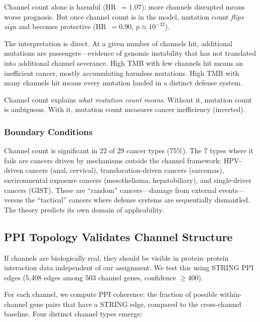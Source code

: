 \documentclass[11pt]{article}
\begin{document}
Channel count alone is harmful (HR~$= 1.07$): more channels
disrupted means worse prognosis. But once channel count is in the
model, mutation count \emph{flips sign} and becomes protective
(HR~$= 0.90$, $p \approx 10^{-32}$).

The interpretation is direct. At a given number of channels hit,
additional mutations are passengers---evidence of genomic
instability that has not translated into additional channel
severance. High TMB with few channels hit means an inefficient
cancer, mostly accumulating harmless mutations. High TMB with
many channels hit means every mutation landed in a distinct
defense system.

Channel count explains \emph{what mutation count means}. Without
it, mutation count is ambiguous. With it, mutation count measures
cancer inefficiency (inverted).

\subsubsection{Boundary Conditions}

Channel count is significant in 22 of 29 cancer types (75\%).
The 7 types where it fails are cancers driven by mechanisms
outside the channel framework: HPV-driven cancers (anal,
cervical), translocation-driven cancers (sarcomas), environmental
exposure cancers (mesothelioma, hepatobiliary), and single-driver
cancers (GIST). These are ``random'' cancers---damage from
external events---versus the ``tactical'' cancers where defense
systems are sequentially dismantled. The theory predicts its own
domain of applicability.

\subsection{PPI Topology Validates Channel Structure}
\label{sec:ppi}

If channels are biologically real, they should be visible in
protein--protein interaction data independent of our assignment.
We test this using STRING PPI edges (5{,}408 edges among 503
channel genes, confidence $\geq 400$).

For each channel, we compute PPI coherence: the fraction of
possible within-channel gene pairs that have a STRING edge,
compared to the cross-channel baseline. Four distinct channel
types emerge:
\end{document}
